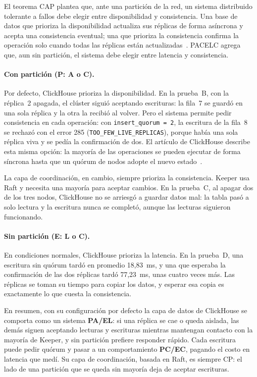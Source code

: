 \documentclass[12pt,a4paper]{article}
\begin{document}
El teorema CAP plantea que, ante una partición de la red, un sistema
distribuido tolerante a fallos debe elegir entre disponibilidad y
consistencia. Una base de datos que prioriza la disponibilidad actualiza
sus réplicas de forma asíncrona y acepta una consistencia eventual; una
que prioriza la consistencia confirma la operación solo cuando todas las
réplicas están actualizadas~\cite[p.~3]{ferreira2024}. PACELC agrega que,
aun sin partición, el sistema debe elegir entre latencia y consistencia.

\paragraph{Con partición (P: A o C).} Por defecto, ClickHouse prioriza la
disponibilidad. En la prueba~B, con la réplica~2 apagada, el clúster
siguió aceptando escrituras: la fila~7 se guardó en una sola réplica y
la otra la recibió al volver. Pero el sistema permite pedir consistencia
en cada operación: con \texttt{insert\_quorum = 2}, la escritura de la
fila~8 se rechazó con el error 285 (\texttt{TOO\_FEW\_LIVE\_REPLICAS}),
porque había una sola réplica viva y se pedía la confirmación de dos.
El artículo de ClickHouse describe esta misma opción: la mayoría de las
operaciones se pueden ejecutar de forma síncrona hasta que un quórum de
nodos adopte el nuevo estado~\cite[p.~3736]{schulze2024}.

La capa de coordinación, en cambio, siempre prioriza la consistencia.
Keeper usa Raft y necesita una mayoría para aceptar cambios. En la
prueba~C, al apagar dos de los tres nodos, ClickHouse no se arriesgó a
guardar datos mal: la tabla pasó a solo lectura y la escritura nunca se
completó, aunque las lecturas siguieron funcionando.

\paragraph{Sin partición (E: L o C).} En condiciones normales, ClickHouse
prioriza la latencia. En la prueba~D, una escritura sin quórum tardó en
promedio 18,83~ms, y una que esperaba la confirmación de las dos
réplicas tardó 77,23~ms, unas cuatro veces más. Las réplicas se toman su
tiempo para copiar los datos, y esperar esa copia es exactamente lo que
cuesta la consistencia.

En resumen, con su configuración por defecto la capa de datos de
ClickHouse se comporta como un sistema \textbf{PA/EL}: si una réplica se
cae o queda aislada, las demás siguen aceptando lecturas y escrituras
mientras mantengan contacto con la mayoría de Keeper, y sin partición
prefiere responder rápido. Cada escritura puede pedir quórum y pasar a un
comportamiento \textbf{PC/EC}, pagando el costo en latencia que medí. Su
capa de coordinación, basada en Raft, es siempre CP: el lado de una
partición que se queda sin mayoría deja de aceptar escrituras.
\end{document}
